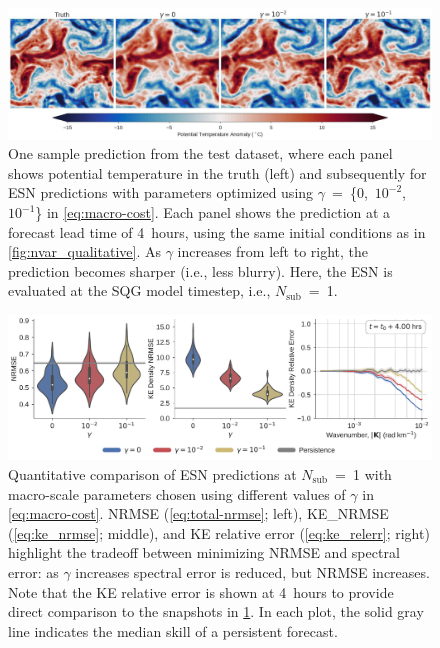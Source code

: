 \documentclass[draft]{agujournal2019}
\newcommand{\nsub}{N_\text{sub}}
\begin{document}

\begin{figure}
    \centering
    \includegraphics[width=\textwidth]{rc_qualitative_gamma.jpg}
    \caption{
        One sample prediction from the test dataset, where each panel shows
        potential temperature in the truth (left) and subsequently for
        ESN predictions with parameters optimized using
        $\gamma$~=~\{0,~$10^{-2}$,~$10^{-1}$\} in \cref{eq:macro-cost}.
        Each panel shows the prediction at a forecast lead time of 4~hours,
        using the same initial conditions as in \cref{fig:nvar_qualitative}.
        As $\gamma$ increases from left to right, the prediction becomes sharper
        (i.e., less blurry).
        Here, the ESN is evaluated at the SQG model timestep, i.e., $\nsub$~=~1.
    }
    \label{fig:rc_qualitative_nsub01}
\end{figure}

\begin{figure}
    \centering
    \includegraphics[width=\textwidth]{rc_all_nsub01.pdf}
    \caption{
        Quantitative comparison of ESN predictions at $\nsub$~=~1 with macro-scale
        parameters
        chosen using different values of $\gamma$ in \cref{eq:macro-cost}.
        NRMSE (\cref{eq:total-nrmse}; left), KE\_NRMSE (\cref{eq:ke_nrmse};
        middle), and
        KE relative error (\cref{eq:ke_relerr}; right) highlight the tradeoff
        between minimizing NRMSE and spectral error: as $\gamma$ increases
        spectral error is reduced, but NRMSE increases.
        Note that the KE relative error is shown at 4~hours to provide
        direct comparison to the snapshots in \cref{fig:rc_qualitative_nsub01}.
        In each plot, the solid gray line indicates the median skill of a persistent
        forecast.
    }
    \label{fig:rc_quantiative_nsub01}
\end{figure}
\end{document}
